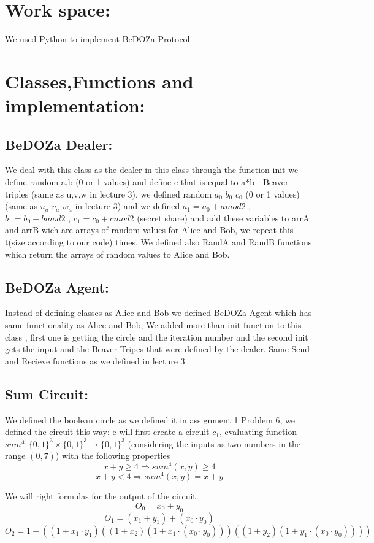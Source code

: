 \documentclass{article}
\begin{document}
\section*{Work space:}
We used Python to implement BeDOZa Protocol
\section*{Classes,Functions and implementation:}
\subsection*{BeDOZa Dealer:}
We deal with this class as the dealer in this class through the function init we define random a,b (0 or 1 values) and define c that is equal to a*b - Beaver triples (same as u,v,w in lecture 3), we defined random $a_0$ $b_0$ $c_0$ (0 or 1 values) (same as $u_a$ $v_a$ $w_a$ in lecture 3) and we defined $a_1=a_0+a mod 2$ , $b_1=b_0 + b mod 2 $ , $c_1=c_0 + c mod 2$ (secret share) and add these variables to arrA and arrB wich are arrays of random values for Alice and Bob, we repeat this t(size according to our code) times.
We defined also RandA and RandB  functions which return the arrays of random values to Alice and Bob.
\subsection*{BeDOZa Agent:}
Instead of defining classes as Alice and Bob we defined BeDOZa Agent which has same functionality as Alice and Bob, We added more than init function to this class , first one is getting the circle and the iteration number and the second init gets the input and the Beaver Tripes that were defined by the dealer.
Same Send and Recieve functions as we defined in lecture 3.
\subsection*{Sum Circuit:}
We defined the boolean circle as we defined it in assignment 1 Problem 6, we defined the circuit this way:
e will first create a circuit $c_1$, evaluating function $sum^{4}:\{0,1\}^3 \times \{0,1\}^3 \to \{0,1\}^3$ (considering the inputs as two numbers in the range $(0,7)$) with the following properties
\[
x+y \geq 4 \Rightarrow sum^{4}(x,y) \geq 4 \]\[
x+y < 4 \Rightarrow  sum^{4}(x,y) = x+y
\]

We will right formulas for the output of the circuit 
\[O_0 = x_0 + y_0\]
\[O_1 = (x_1 + y_1) + (x_0 \cdot y_0)\]
\[O_2 = 1+((1+x_1\cdot y_1)((1+x_2)(1+ x_1\cdot (x_0 \cdot y_0)))((1+y_2)(1+y_1\cdot (x_0 \cdot y_0))))\]
\end{document}
